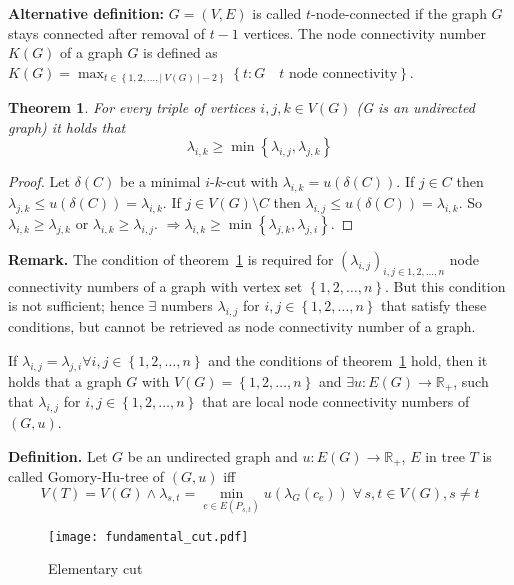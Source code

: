 \documentclass{article}
\newtheorem{theorem}{Theorem}
\newcommand{\card}[1]{\left|\:\!#1\:\!\right|}
\newcommand{\set}[1]{\left\{#1\right\}}
\newcommand{\fall}{\;\forall\,}
\begin{document}
\textbf{Alternative definition:}
  $G = (V, E)$ is called $t$-node-connected if the graph $G$ stays connected after removal of $t-1$ vertices. The node connectivity number $K(G)$ of a graph $G$ is defined as $K(G) = \max_{t \in \set{1, 2, \ldots, \card{V(G)} - 2}} \set{t: G \quad t \text{ node connectivity}}$.

\begin{theorem}\label{lemma-4.5}
  For every triple of vertices $i, j, k \in V(G)$ (G is an undirected graph) it holds that
  \[
    \lambda_{i,k} \geq \min{\set{\lambda_{i,j}, \lambda_{j,k}}}
  \]
\end{theorem}

\begin{proof}
  Let $\delta(C)$ be a minimal $i$-$k$-cut with $\lambda_{i,k} = u(\delta(C))$.
  If $j \in C$ then $\lambda_{j,k} \leq u(\delta(C)) = \lambda_{i,k}$.
  If $j \in V(G) \setminus C$ then $\lambda_{i,j} \leq u(\delta(C)) = \lambda_{i,k}$.
  So $\lambda_{i,k} \geq \lambda_{j,k}$ or $\lambda_{i,k} \geq \lambda_{i,j}$.
  $\Rightarrow \lambda_{i,k} \geq \min{\set{\lambda_{j,k}, \lambda_{j,i}}}$.
\end{proof}

\textbf{Remark.}
  The condition of theorem~\ref{lemma-4.5} is required for $(\lambda_{i,j})_{i,j \in 1, 2, \ldots, n}$ node connectivity numbers of a graph with vertex set $\set{1, 2, \ldots, n}$.
  But this condition is not sufficient; hence $\exists$ numbers $\lambda_{i,j}$ for $i,j \in \set{1, 2, \ldots, n}$ that satisfy these conditions, but cannot be retrieved as node connectivity number of a graph.

  If $\lambda_{i,j} = \lambda_{j,i} \forall i,j \in \set{1, 2, \ldots, n}$ and the conditions of theorem~\ref{lemma-4.5} hold, then it holds that a graph $G$ with $V(G) = \set{1, 2, \ldots, n}$ and $\exists u: E(G) \rightarrow \mathbb{R}_+$, such that $\lambda_{i,j}$ for $i,j \in \set{1, 2, \ldots, n}$ that are local node connectivity numbers of $(G, u)$.

\textbf{Definition.}
  Let $G$ be an undirected graph and $u: E(G) \rightarrow \mathbb{R}_+$, $E$ in tree $T$ is called Gomory-Hu-tree of $(G, u)$ iff
  \[
    V(T) = V(G) \land \lambda_{s,t} = \min_{e \in E(P_{s,t})} u(\lambda_G (c_e)) \fall s,t \in V(G), s \neq t
  \]

\begin{figure}[h]
 \begin{center}
  \texttt{[image: fundamental\_cut.pdf]}
  \caption{Elementary cut}
 \end{center}
\end{figure}
\end{document}
